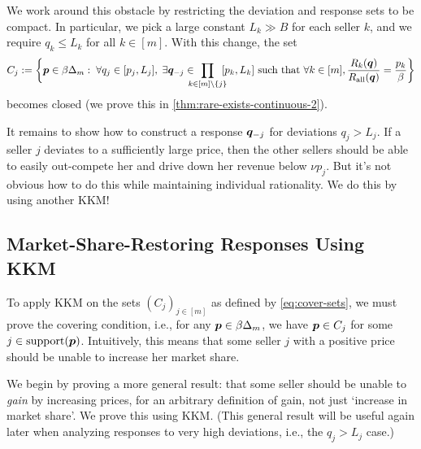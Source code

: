 We work around this obstacle by restricting the deviation and response sets to be compact.
In particular, we pick a large constant $L_k \gg B$ for each seller $k$,
and we require $q_k \le L_k$ for all $k \in [m]$.
With this change, the set
\begin{equation}
\label{eq:cover-sets}
C_j \defeq \bigg\{\pvec \in \beta\Delta_m:\; \forall q_j \in [p_j, L_j],\;
    \exists \qvec_{-j} \in \!\!\!\!\!\prod_{k \in [m] \setminus \{j\}} \!\!\! [p_k, L_k] \text{ such that }
    \forall k \in [m], \frac{R_k(\qvec)}{R_{\all}(\qvec)} = \frac{p_k}{\beta} \bigg\}
\end{equation}
becomes closed (we prove this in \cref{thm:rare-exists-continuous-2}).

It remains to show how to construct a response $\bm{q}_{-j}$ for deviations $q_j > L_j$.
If a seller $j$ deviates to a sufficiently large price, then the other sellers should be able to
easily out-compete her and drive down her revenue below $\nu p_j$.
But it's not obvious how to do this while maintaining individual rationality.
We do this by using another KKM!

\subsection{Market-Share-Restoring Responses Using KKM}
\label{sec:exist:kkm}

To apply KKM on the sets $(C_j)_{j \in [m]}$ as defined by \cref{eq:cover-sets},
we must prove the covering condition, i.e., for any $\bm{p} \in \beta\Delta_m$,
we have $\bm{p} \in C_j$ for some $j \in \operatorname{support}(\bm{p})$.
Intuitively, this means that some seller $j$ with a positive price
should be unable to increase her market share.

We begin by proving a more general result: that some seller should be unable to \emph{gain}
by increasing prices, for an arbitrary definition of gain, not just `increase in market share'.
We prove this using KKM.
(This general result will be useful again later when analyzing responses to very high deviations,
i.e., the $q_j > L_j$ case.)

